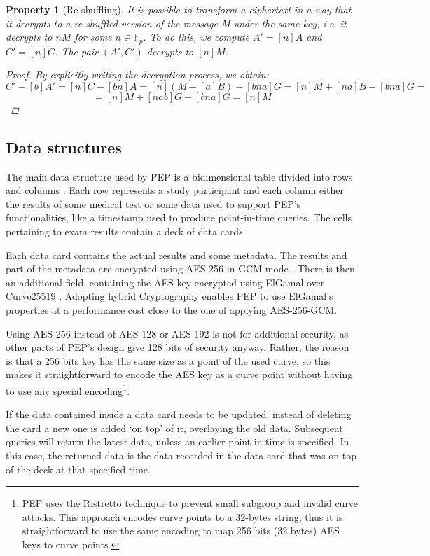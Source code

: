 \documentclass{report}
\newtheorem{property}{Property}
\begin{document}
\begin{property}[Re-shuffling] It is possible to transform a ciphertext in a way that it decrypts to a re-shuffled version of the message M under the same key, i.e. it decrypts to $nM$ for
		some $n \in \mathds{F}_p$. To do this, we compute $A'=[n]A$ and $C'=[n]C$. The pair $(A', C')$ decrypts to $[n]M$. \newline
\begin{proof}
		By explicitly writing the decryption process, we obtain:
		$$C'-[b]A'=[n]C-[bn]A=[n](M+[a]B)-[bna]G=[n]M+[na]B-[bna]G=$$
		$$=[n]M+[nab]G-[bna]G=[n]M$$
\end{proof}
\end{property}

\subsection{Data structures}\label{data_structures}
The main data structure used by PEP is a bidimensional table divided into rows and columns \cite{pep-blueprint}. Each row represents a study participant and each column either the 
results of some medical test or some data used to support PEP's functionalities, like a timestamp used to produce point-in-time queries. The cells pertaining to exam results contain a 
deck of data cards. \par {}
Each data card contains the actual results and some metadata. The results and part of the metadata are encrypted using AES-256 \cite{AES-standard} in GCM mode \cite{GCM}. There is then 
an additional field, containing the AES key encrypted using ElGamal over Curve25519 \cite{elliptic-elgamal}. Adopting hybrid Cryptography enables PEP to use ElGamal's properties at a 
performance cost close to the one of applying AES-256-GCM. \par
Using AES-256 instead of AES-128 or AES-192 is not for additional security, as other parts of PEP's design give 128 bits of
security anyway. Rather, the reason is that a 256 bits key has the same size as a point of the used curve, so this makes it straightforward to encode the AES key as a curve point
without having to use any special encoding\footnote{PEP uses the Ristretto technique\cite{ristretto-website} to prevent small subgroup and invalid curve attacks. This approach
encodes curve points to a 32-bytes string, thus it is straightforward to use the same encoding to map 256 bits (32 bytes) AES keys to curve points.}. \par
If the data contained inside a data card needs to be updated, instead of deleting the card a new one is added \enquote*{on top} of it, overlaying the old data. Subsequent queries will
return the latest data, unless an earlier point in time is specified. In this case, the returned data is the data recorded in the data card that was on top of the deck at that specified
time.
\end{document}
